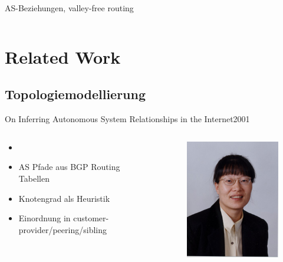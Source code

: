 \documentclass[ngerman,compress,hyperref={bookmarks}]{beamer}
\begin{document}
\begin{frame}{AS-Beziehungen, valley-free routing}
\begin{columns}[c]
 \end{columns}
\end{frame}


\section{Related Work}

\subsection{Topologiemodellierung}
\begin{frame}{On Inferring Autonomous System Relationships in the Internet}{2001}
\begin{columns}[c]
 \begin{column}{0.5\textwidth}
  \begin{itemize}
   \item \cite{Gao:2001:IAS:504611.504616}
   \item AS Pfade aus BGP Routing Tabellen
   \item Knotengrad als Heuristik
   \item Einordnung in customer-provider/peering/sibling
  \end{itemize}
 \end{column}
 \begin{column}{0.1\textwidth}
  \begin{figure}
   \includegraphics[width=1\textwidth]{images/gao}

\end{figure}
\end{column}
\end{columns}
\end{frame}
\end{document}
